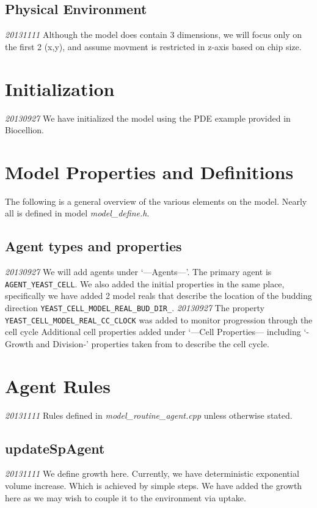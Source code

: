 \documentclass{article}
\begin{document}
\subsection{Physical Environment}
\emph{20131111} Although the model does contain 3 dimensions,
we will focus only on the first 2 (x,y), 
and assume movment is restricted in z-axis based on chip size.

\section{Initialization}
\emph{20130927} We have initialized the model using the PDE example provided in Biocellion.

\section{Model Properties and Definitions}
The following is a general overview of the various elements on the model.
Nearly all is defined in model \emph{model\_define.h}.

\subsection{Agent types and properties}
\emph{20130927} We will add agents under `---Agents---'.
The primary agent is \texttt{AGENT\_YEAST\_CELL}.
We also added the initial properties in the same place,
specifically we have added 2 model reals that describe the 
location of the budding direction \texttt{YEAST\_CELL\_MODEL\_REAL\_BUD\_DIR\_}.
\emph{20130927} The property \texttt{YEAST\_CELL\_MODEL\_REAL\_CC\_CLOCK}
was added to monitor progression through the cell cycle \cite{Charvin2009}
Additional cell properties added under `---Cell Properties--- including 
`-Growth and Division-' properties taken from \cite{Charvin2009} to describe the cell cycle.

\section{Agent Rules}
\emph{20131111} Rules defined in \emph{model\_routine\_agent.cpp} unless otherwise stated.

\subsection{updateSpAgent}
\emph{20131111} We define growth here.  
Currently, we have deterministic exponential volume increase.
Which is achieved by simple steps.  
We have added the growth here as we may wish to couple it to the environment via uptake.
\end{document}

